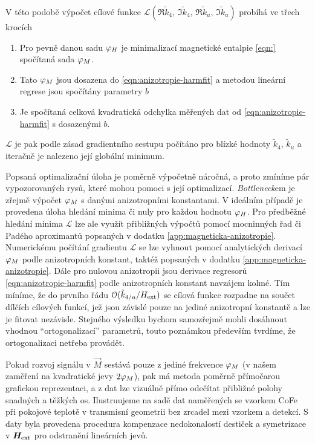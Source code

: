 V této podobě výpočet cílové funkce $\mathcal{L}(\Re\tilde{k}_4,\,\Im\tilde{k}_4,\,\Re\tilde{k}_u,\,\Im\tilde{k}_u)$ probíhá ve třech krocích
\begin{enumerate}
    \item Pro pevně danou sadu $\varphi_H$ je minimalizací magnetické entalpie \eqref{eqn:} spočítaná sada $\varphi_M$.
    \item Tato $\varphi_M$ jsou dosazena do \eqref{eqn:anizotropie-harmfit} a metodou lineární regrese jsou spočítány parametry $b$
    \item Je spočítaná celková kvadratická odchylka měřených dat od \eqref{eqn:anizotropie-harmfit} s dosazenými $b$.
\end{enumerate}
$\mathcal{L}$ je pak podle zásad gradientního sestupu počítáno pro blízké hodnoty $\tilde{k}_4$, $\tilde{k}_u$ a iteračně je nalezeno její globální minimum.

Popsaná optimalizační úloha je poměrně výpočetně náročná, a proto zmíníme pár vypozorovaných rysů, které mohou pomoci s její optimalizací.
\emph{Bottleneck}em je zřejmě výpočet $\varphi_M$ s danými anizotropními konstantami.
V ideálním případě je provedena úloha hledání minima či nuly pro každou hodnotu $\varphi_H$.
Pro předběžné hledání minima $\mathcal{L}$ lze ale využít přibližných výpočtů pomocí mocninných řad či Padého aproximantů popsaných v dodatku \ref{app:magneticka-anizotropie}.
Numerickému počítání gradientu $\mathcal{L}$ se lze vyhnout pomocí analytických derivací $\varphi_M$ podle anizotropních konstant, taktéž popsaných v dodatku \ref{app:magneticka-anizotropie}.
Dále pro nulovou anizotropii jsou derivace regresorů \eqref{eqn:anizotropie-harmfit} podle anizotropních konstant navzájem kolmé.
Tím míníme, že do prvního řádu $\mathcal{O}(\tilde{k}_{4/u}/H_\textrm{ext})$ se cílová funkce rozpadne na součet dílčích cílových funkcí, jež jsou závislé pouze na jediné anizotropní konstantě a lze je fitovat nezávisle.
Stejného výsledku bychom samozřejmě mohli dosáhnout vhodnou ``ortogonalizací'' parametrů, touto poznámkou především tvrdíme, že ortogonalizaci netřeba provádět.

Pokud rozvoj signálu v $\vec{M}$ sestává pouze z jediné frekvence $\varphi_M$ (v našem zaměření na kvadratické jevy $2\varphi_M$), pak má metoda poměrně přímočarou grafickou reprezentaci, a z dat lze vizuálně přímo odečítat přibližné polohy snadných a těžkých os.
Ilustruujeme na sadě dat naměřených se vzorkem CoFe při pokojové teplotě v transmisní geometrii bez zrcadel mezi vzorkem a detekcí.
S daty byla provedena procedura kompenzace nedokonalostí destiček a symetrizace v $\bm{H}_\textrm{ext}$ pro odstranění lineárních jevů.

